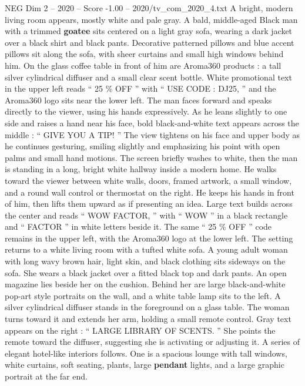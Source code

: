 \begin{textsample}{NEG Dim 2 – 2020 – Score -1.00 – 2020/tv\_com\_2020\_4.txt}  \label{ex:f2_neg_052}
A bright, modern living room appears, mostly white and pale gray.
A bald, middle-aged Black man with a trimmed \textbf{goatee} sits centered on a light gray sofa, wearing a dark jacket over a black shirt and black pants.
Decorative patterned pillows and blue accent pillows sit along the sofa, with sheer curtains and small high windows behind him.
On the glass coffee table in front of him are Aroma360 products : a tall silver cylindrical diffuser and a small clear scent bottle.
White promotional text in the upper left reads “ 25 \% OFF ” with “ USE CODE : DJ25, ” and the Aroma360 logo sits near the lower left.
The man faces forward and speaks directly to the viewer, using his hands expressively.
As he leans slightly to one side and raises a hand near his face, bold black-and-white text appears across the middle : “ GIVE YOU A TIP! ” The view tightens on his face and upper body as he continues gesturing, smiling slightly and emphasizing his point with open palms and small hand motions.
The screen briefly washes to white, then the man is standing in a long, bright white hallway inside a modern home.
He walks toward the viewer between white walls, doors, framed artwork, a small window, and a round wall control or thermostat on the right.
He keeps his hands in front of him, then lifts them upward as if presenting an idea.
Large text builds across the center and reads “ WOW FACTOR, ” with “ WOW ” in a black rectangle and “ FACTOR ” in white letters beside it.
The same “ 25 \% OFF ” code remains in the upper left, with the Aroma360 logo at the lower left.
The setting returns to a white living room with a tufted white sofa.
A young adult woman with long wavy brown hair, light skin, and black clothing sits sideways on the sofa.
She wears a black jacket over a fitted black top and dark pants.
An open magazine lies beside her on the cushion.
Behind her are large black-and-white pop-art style portraits on the wall, and a white table lamp sits to the left.
A silver cylindrical diffuser stands in the foreground on a glass table.
The woman turns toward it and extends her arm, holding a small remote control.
Gray text appears on the right : “ LARGE LIBRARY OF SCENTS. ” She points the remote toward the diffuser, suggesting she is activating or adjusting it.
A series of elegant hotel-like interiors follows.
One is a spacious lounge with tall windows, white curtains, soft seating, plants, large \textbf{pendant} lights, and a large graphic portrait at the far end.

\end{textsample}
